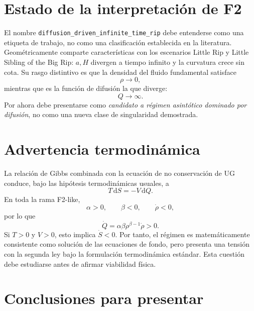 \documentclass[11pt,a4paper]{article}
\newcommand{\dd}{\mathrm{d}}
\begin{document}
\section{Estado de la interpretación de F2}

El nombre \texttt{diffusion\_driven\_infinite\_time\_rip} debe entenderse
como una etiqueta de trabajo, no como una clasificación establecida en la
literatura. Geométricamente comparte características con los escenarios
Little Rip y Little Sibling of the Big Rip: $a,H$ divergen a tiempo
infinito y la curvatura crece sin cota. Su rasgo distintivo es que la
densidad del fluido fundamental satisface
\[
\rho\to0,
\]
mientras que es la función de difusión la que diverge:
\[
Q\to\infty.
\]
Por ahora debe presentarse como \emph{candidato a régimen asintótico
dominado por difusión}, no como una nueva clase de singularidad demostrada.

\section{Advertencia termodinámica}

La relación de Gibbs combinada con la ecuación de no conservación de UG
conduce, bajo las hipótesis termodinámicas usuales, a
\begin{equation}
    T\,\dd S=-V\,\dd Q.
\end{equation}
En toda la rama F2-like,
\[
\alpha>0,\qquad
\beta<0,\qquad
\dot\rho<0,
\]
por lo que
\begin{equation}
    \dot Q
    =
    \alpha\beta\rho^{\beta-1}\dot\rho
    >0.
\end{equation}
Si $T>0$ y $V>0$, esto implica $\dot S<0$. Por tanto, el régimen es
matemáticamente consistente como solución de las ecuaciones de fondo,
pero presenta una tensión con la segunda ley bajo la formulación
termodinámica estándar. Esta cuestión debe estudiarse antes de afirmar
viabilidad física.

\section{Conclusiones para presentar}
\end{document}
